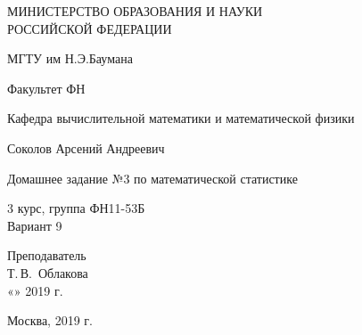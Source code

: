 \documentclass[14pt,a4paper]{scrartcl}
\begin{document}
	\begin{titlepage}
	\begin{center}
		\large
		МИНИСТЕРСТВО ОБРАЗОВАНИЯ И НАУКИ\\ РОССИЙСКОЙ ФЕДЕРАЦИИ
		
		\vspace{0.5cm}
		
		МГТУ им Н.Э.Баумана
		\vspace{0.25cm}
		
		Факультет ФН
		
		Кафедра вычислительной математики и математической физики
		\vfill
		
		
		Соколов Арсений Андреевич\\
		\vfill
		
		
		{\LARGE Домашнее задание №3 по математической статистике\\[2mm]
		}
		\bigskip
		
		3 курс, группа ФН11-53Б\\
		Вариант 9
	\end{center}
	\vfill
	
	\newlength{\ML}
	\hfill\begin{minipage}{0.4\textwidth}
		Преподаватель\\
		\underline{\hspace{3cm}} Т.\,В.~Облакова\\
		«\underline{\hspace{0.7cm}}» \underline{\hspace{1.71cm}} 2019 г.
	\end{minipage}%
	\bigskip
	
	
	\vfill
	
	\begin{center}
		Москва, 2019 г.
	\end{center}
\end{titlepage}
\end{document}
